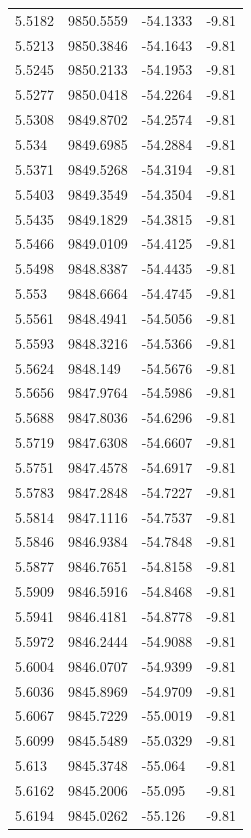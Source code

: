\begin{table}[H]
\begin{tabular}{llll}
5.5182 & 9850.5559 & -54.1333 & -9.81 \\
5.5213 & 9850.3846 & -54.1643 & -9.81 \\
5.5245 & 9850.2133 & -54.1953 & -9.81 \\
5.5277 & 9850.0418 & -54.2264 & -9.81 \\
5.5308 & 9849.8702 & -54.2574 & -9.81 \\
5.534 & 9849.6985 & -54.2884 & -9.81 \\
5.5371 & 9849.5268 & -54.3194 & -9.81 \\
5.5403 & 9849.3549 & -54.3504 & -9.81 \\
5.5435 & 9849.1829 & -54.3815 & -9.81 \\
5.5466 & 9849.0109 & -54.4125 & -9.81 \\
5.5498 & 9848.8387 & -54.4435 & -9.81 \\
5.553 & 9848.6664 & -54.4745 & -9.81 \\
5.5561 & 9848.4941 & -54.5056 & -9.81 \\
5.5593 & 9848.3216 & -54.5366 & -9.81 \\
5.5624 & 9848.149 & -54.5676 & -9.81 \\
5.5656 & 9847.9764 & -54.5986 & -9.81 \\
5.5688 & 9847.8036 & -54.6296 & -9.81 \\
5.5719 & 9847.6308 & -54.6607 & -9.81 \\
5.5751 & 9847.4578 & -54.6917 & -9.81 \\
5.5783 & 9847.2848 & -54.7227 & -9.81 \\
5.5814 & 9847.1116 & -54.7537 & -9.81 \\
5.5846 & 9846.9384 & -54.7848 & -9.81 \\
5.5877 & 9846.7651 & -54.8158 & -9.81 \\
5.5909 & 9846.5916 & -54.8468 & -9.81 \\
5.5941 & 9846.4181 & -54.8778 & -9.81 \\
5.5972 & 9846.2444 & -54.9088 & -9.81 \\
5.6004 & 9846.0707 & -54.9399 & -9.81 \\
5.6036 & 9845.8969 & -54.9709 & -9.81 \\
5.6067 & 9845.7229 & -55.0019 & -9.81 \\
5.6099 & 9845.5489 & -55.0329 & -9.81 \\
5.613 & 9845.3748 & -55.064 & -9.81 \\
5.6162 & 9845.2006 & -55.095 & -9.81 \\
5.6194 & 9845.0262 & -55.126 & -9.81 \\

\end{tabular}
\end{table}
